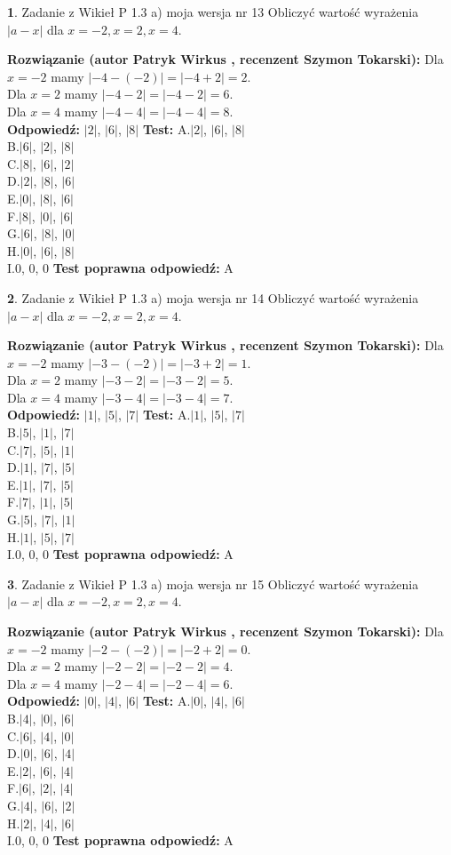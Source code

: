 \documentclass[12pt, a4paper]{article}
\theoremstyle{definition} %
\newtheorem{zad}{}
\newcommand{\zadStart}[1]{\begin{zad}#1\newline}
\newcommand{\zadStop}{\end{zad}}
\newcommand{\rozwStart}[2]{\noindent \textbf{Rozwiązanie (autor #1 , recenzent #2): }\newline}
\newcommand{\rozwStop}{\newline}
\newcommand{\odpStart}{\noindent \textbf{Odpowiedź:}\newline}
\newcommand{\odpStop}{\newline}
\newcommand{\testStart}{\noindent \textbf{Test:}\newline}
\newcommand{\testStop}{\newline}
\newcommand{\kluczStart}{\noindent \textbf{Test poprawna odpowiedź:}\newline}
\newcommand{\kluczStop}{\newline}
\begin{document}
\zadStart{Zadanie z Wikieł P 1.3 a) moja wersja nr 13}
Obliczyć wartość wyrażenia $|a - x|$ dla $x=-2,x=2,x=4$.
\zadStop
\rozwStart{Patryk Wirkus}{Szymon Tokarski}
Dla $x = -2$ mamy $|-4 - (-2)| = |-4 + 2| = 2$.\\
Dla $x = 2$ mamy $|-4 - 2| = |-4 - 2| = 6$.\\
Dla $x = 4$ mamy $|-4 - 4| = |-4 - 4| = 8$.\\
\rozwStop
\odpStart
$|2|$, $|6|$, $|8|$
\odpStop
\testStart
A.$|2|$, $|6|$, $|8|$\\
B.$|6|$, $|2|$, $|8|$\\
C.$|8|$, $|6|$, $|2|$\\
D.$|2|$, $|8|$, $|6|$\\
E.$|0|$, $|8|$, $|6|$\\
F.$|8|$, $|0|$, $|6|$\\
G.$|6|$, $|8|$, $|0|$\\
H.$|0|$, $|6|$, $|8|$\\
I.$0$, $0$, $0$
\testStop
\kluczStart
A
\kluczStop



\zadStart{Zadanie z Wikieł P 1.3 a) moja wersja nr 14}
Obliczyć wartość wyrażenia $|a - x|$ dla $x=-2,x=2,x=4$.
\zadStop
\rozwStart{Patryk Wirkus}{Szymon Tokarski}
Dla $x = -2$ mamy $|-3 - (-2)| = |-3 + 2| = 1$.\\
Dla $x = 2$ mamy $|-3 - 2| = |-3 - 2| = 5$.\\
Dla $x = 4$ mamy $|-3 - 4| = |-3 - 4| = 7$.\\
\rozwStop
\odpStart
$|1|$, $|5|$, $|7|$
\odpStop
\testStart
A.$|1|$, $|5|$, $|7|$\\
B.$|5|$, $|1|$, $|7|$\\
C.$|7|$, $|5|$, $|1|$\\
D.$|1|$, $|7|$, $|5|$\\
E.$|1|$, $|7|$, $|5|$\\
F.$|7|$, $|1|$, $|5|$\\
G.$|5|$, $|7|$, $|1|$\\
H.$|1|$, $|5|$, $|7|$\\
I.$0$, $0$, $0$
\testStop
\kluczStart
A
\kluczStop



\zadStart{Zadanie z Wikieł P 1.3 a) moja wersja nr 15}
Obliczyć wartość wyrażenia $|a - x|$ dla $x=-2,x=2,x=4$.
\zadStop
\rozwStart{Patryk Wirkus}{Szymon Tokarski}
Dla $x = -2$ mamy $|-2 - (-2)| = |-2 + 2| = 0$.\\
Dla $x = 2$ mamy $|-2 - 2| = |-2 - 2| = 4$.\\
Dla $x = 4$ mamy $|-2 - 4| = |-2 - 4| = 6$.\\
\rozwStop
\odpStart
$|0|$, $|4|$, $|6|$
\odpStop
\testStart
A.$|0|$, $|4|$, $|6|$\\
B.$|4|$, $|0|$, $|6|$\\
C.$|6|$, $|4|$, $|0|$\\
D.$|0|$, $|6|$, $|4|$\\
E.$|2|$, $|6|$, $|4|$\\
F.$|6|$, $|2|$, $|4|$\\
G.$|4|$, $|6|$, $|2|$\\
H.$|2|$, $|4|$, $|6|$\\
I.$0$, $0$, $0$
\testStop
\kluczStart
A
\kluczStop
\end{document}
